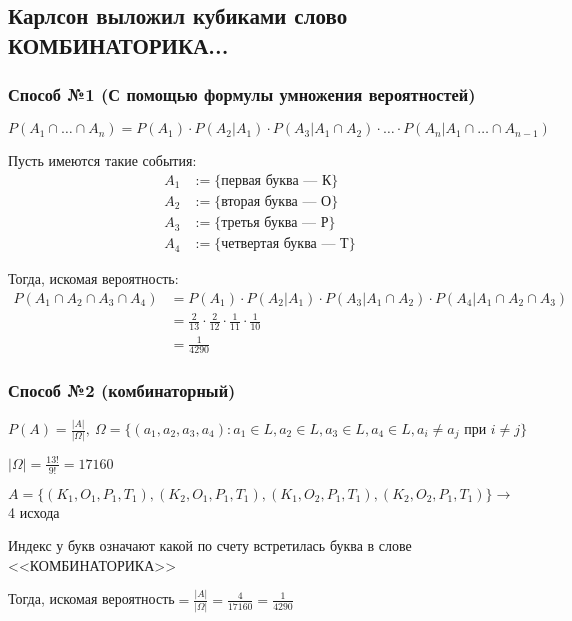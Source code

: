 \documentclass{article}
\begin{document}
\subsection{Карлсон выложил кубиками слово КОМБИНАТОРИКА...}
\subsubsection*{Способ №1 (С помощью формулы умножения вероятностей)}
$P(A_1\cap \ldots \cap A_n)=P(A_1)\cdot P(A_2|A_1)\cdot P(A_3|A_1\cap A_2)\cdot\ldots\cdot P(A_n|A_1\cap\ldots\cap A_{n-1})$



Пусть имеются такие события: \begin{equation*}
    \begin{aligned}
        A_1&:=\{\text{первая буква — К}\}\\
        A_2&:=\{\text{вторая буква — О}\}\\
        A_3&:=\{\text{третья буква — Р}\}\\
        A_4&:=\{\text{четвертая буква — Т}\}
    \end{aligned}
\end{equation*}

Тогда, искомая вероятность:
\begin{equation*}
\begin{aligned}
    P(A_1\cap A_2\cap A_3\cap A_4)&=P(A_1)\cdot P(A_2|A_1)\cdot P(A_3|A_1\cap A_2)\cdot P(A_4|A_1\cap A_2\cap A_3)\\
    &=\frac{2}{13}\cdot\frac{2}{12}\cdot\frac{1}{11}\cdot\frac{1}{10}\\
    &=\frac{1}{4290}
    \end{aligned}
\end{equation*}

\subsubsection*{Способ №2 (комбинаторный)}
$P(A)=\displaystyle\frac{|A|}{|\Omega|},\ \Omega=\{(a_1,a_2,a_3,a_4):a_1\in L, a_2\in L, a_3\in L, a_4\in L, a_i\ne a_j\text{ при }i\ne j\}$

$|\Omega|=\displaystyle\frac{13!}{9!}=17160$

$A=\{(K_1,O_1,P_1,T_1),(K_2,O_1,P_1,T_1),(K_1,O_2,P_1,T_1),(K_2,O_2,P_1,T_1)\}\longrightarrow$ 4 исхода

Индекс у букв означают какой по счету встретилась буква в слове <<КОМБИНАТОРИКА>>

Тогда, искомая вероятность$=\displaystyle\frac{|A|}{|\Omega|}=\frac{4}{17160}=\frac{1}{4290}$
\end{document}

